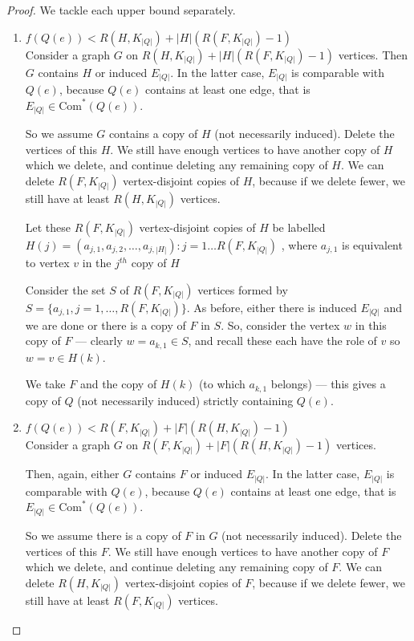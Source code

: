 \documentclass[a4paper,12pt]{article}
\begin{document}
 \begin{proof}

We tackle each upper bound separately.
\begin{enumerate}
\item{$f(Q(e))  <  R(H,K_{|Q|} ) +  |H|(R(F,K_{|Q|}) - 1)$\\

Consider a graph $G$ on $R(H,K_{|Q|} ) +  |H|(R(F,K_{|Q|}) - 1)$ vertices.  Then $G$ contains  $H$ or induced $E_{|Q|}$.  In the latter case, $E_{|Q|}$ is comparable with $Q( e)$,  because $Q(e )$ contains at least one edge, that is $E_{|Q|} \in \text{Com}^*(Q(e))$.
 
So we assume $G$ contains a copy of $H$ (not necessarily induced).  Delete the vertices of this $H$. We still have enough vertices to have another copy of $H$ which we delete, and continue deleting any remaining copy of $H$.  We can delete $R(F , K_{|Q|})$  vertex-disjoint copies of $H$, because if we delete fewer, we still have at least $R(H, K_{|Q|})$ vertices.  

Let these $R(F , K_{|Q|})$ vertex-disjoint copies of $H$ be labelled  $H(j) = (a_{j,1}, a_{j,2},\ldots,a_{j,|H|}): j = 1 \dots R(F , K_{|Q|})$ , where $a­_ {­­j,1}$ is equivalent to vertex $v$ in the $j^{th}$ copy of $H$ 

Consider the set $S$  of $R(F , K_{|Q|})$  vertices formed by $S = \{ a_{j,1} , j = 1,\ldots, R(F , K_{|Q|})   \}$.  As before, either there is induced $E_{|Q|}$ and we are done or there  is a copy of $F$ in $S$.  So, consider  the vertex $w$ in this copy of $F$ --- clearly $w=a_{k,1} \in S$, and recall these each have the role of $v$ so $w = v \in H(k)$.

We take $F$ and the copy of $H(k)$ (to which $a_{k,1}$ belongs) --- this gives a copy of $Q$ (not necessarily induced) strictly containing $Q(e)$. }
\item{$f(Q(e))  <  R(F,K_{|Q|} ) +  |F|( R(H,K_{|Q|} )- 1) $\\

Consider  a graph $G$ on  $R(F,K_{|Q|} ) +  |F|( R(H,K_{|Q|} )- 1)$  vertices. 

 Then, again, either $G$ contains $F$ or induced $E_{|Q|}$.  In the latter case, $E_{|Q|}$ is comparable with $Q( e)$,  because $Q(e )$ contains at least one edge, that is $E_{|Q|} \in \text{Com}^*(Q(e))$.

So we assume there is a copy of $F$ in $G$ (not necessarily induced).  Delete the vertices of this $F$. We still have enough vertices to have another copy of $F$ which we delete, and continue deleting any remaining copy of $F$.  We can delete $R(H , K_{|Q|})$  vertex-disjoint copies of $F$, because if we delete fewer, we still have at least $R(F, K_{|Q|})$ vertices.  

}
\end{enumerate}
\end{proof}
\end{document}
